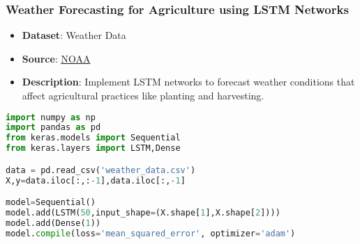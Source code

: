 \begin{frame}[fragile]\frametitle{Weather Forecasting for Agriculture using LSTM Networks}
    \begin{itemize}
        \item \textbf{Dataset}: Weather Data
        \item \textbf{Source}: \href{https://www.ncdc.noaa.gov/cdo-web/}{NOAA}
        \item \textbf{Description}: Implement LSTM networks to forecast weather conditions that affect agricultural practices like planting and harvesting.
    \end{itemize}
    \begin{lstlisting}[language=Python]
import numpy as np
import pandas as pd
from keras.models import Sequential
from keras.layers import LSTM,Dense

data = pd.read_csv('weather_data.csv')
X,y=data.iloc[:,:-1],data.iloc[:,-1]

model=Sequential()
model.add(LSTM(50,input_shape=(X.shape[1],X.shape[2])))
model.add(Dense(1))
model.compile(loss='mean_squared_error', optimizer='adam')
    \end{lstlisting}
\end{frame}

